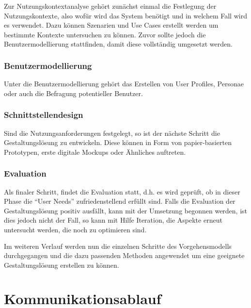 \documentclass[12pt]{scrartcl}
\begin{document}
Zur Nutzungskontextanalyse gehört zunächst einmal die Festlegung der Nutzungskontexte, also wofür wird das System benötigt und in welchem Fall wird es verwendet. Dazu können Szenarien und Use Cases erstellt werden um bestimmte Kontexte untersuchen zu können. Zuvor sollte jedoch die Benutzermodellierung stattfinden, damit diese vollständig umgesetzt werden.

\subsubsection{Benutzermodellierung}

Unter die Benutzermodellierung gehört das Erstellen von User Profiles, Personae oder auch die Befragung potentieller Benutzer. 

\subsubsection{Schnittstellendesign}

Sind die Nutzungsanforderungen festgelegt, so ist der nächste Schritt die Gestaltungslösung zu entwickeln. Diese können in Form von papier-basierten Prototypen, erste digitale Mockups oder Ähnliches auftreten.

\subsubsection{Evaluation}

Als finaler Schritt, findet die Evaluation statt, d.h. es wird geprüft, ob in dieser Phase die “User Needs” zufriedenstellend erfüllt sind. Falls die Evaluation der Gestaltungslösung positiv ausfällt, kann mit der Umsetzung begonnen werden, ist dies jedoch nicht der Fall, so kann mit Hilfe Iteration, die Aspekte erneut untersucht werden, die noch zu optimieren sind.





Im weiteren Verlauf werden nun die einzelnen Schritte des Vorgehensmodells durchgegangen und die dazu passenden Methoden angewendet um eine geeignete Gestaltungslösung erstellen zu können.


\section{Kommunikationsablauf}

\end{document}
